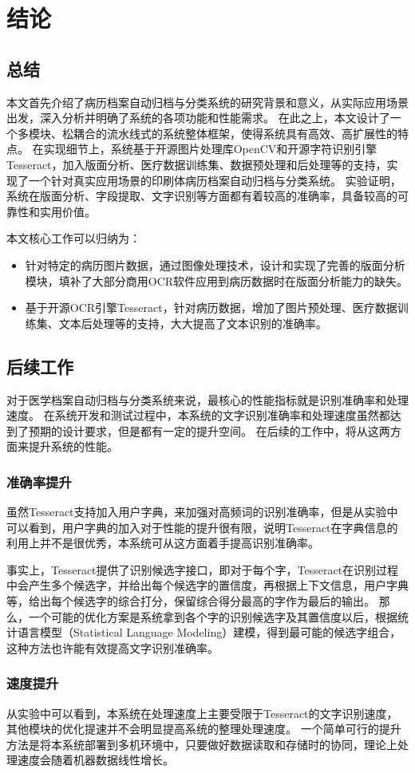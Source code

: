 \chapter{结论}
\label{chap:conclusion}
\section*{总结}
本文首先介绍了病历档案自动归档与分类系统的研究背景和意义，从实际应用场景出发，深入分析并明确了系统的各项功能和性能需求。
在此之上，本文设计了一个多模块、松耦合的流水线式的系统整体框架，使得系统具有高效、高扩展性的特点。
在实现细节上，系统基于开源图片处理库OpenCV和开源字符识别引擎Tesseract，加入版面分析、医疗数据训练集、数据预处理和后处理等的支持，实现了一个针对真实应用场景的印刷体病历档案自动归档与分类系统。
实验证明，系统在版面分析、字段提取、文字识别等方面都有着较高的准确率，具备较高的可靠性和实用价值。

本文核心工作可以归纳为：
\begin{itemize}
  \item 针对特定的病历图片数据，通过图像处理技术，设计和实现了完善的版面分析模块，填补了大部分商用OCR软件应用到病历数据时在版面分析能力的缺失。
  \item 基于开源OCR引擎Tesseract，针对病历数据，增加了图片预处理、医疗数据训练集、文本后处理等的支持，大大提高了文本识别的准确率。
\end{itemize}

\section*{后续工作}
对于医学档案自动归档与分类系统来说，最核心的性能指标就是识别准确率和处理速度。
在系统开发和测试过程中，本系统的文字识别准确率和处理速度虽然都达到了预期的设计要求，但是都有一定的提升空间。
在后续的工作中，将从这两方面来提升系统的性能。
\subsection*{准确率提升}
虽然Tesseract支持加入用户字典，来加强对高频词的识别准确率，但是从实验中可以看到，用户字典的加入对于性能的提升很有限，说明Tesseract在字典信息的利用上并不是很优秀，本系统可从这方面着手提高识别准确率。

事实上，Tesseract提供了识别候选字接口，即对于每个字，Tesseract在识别过程中会产生多个候选字，并给出每个候选字的置信度，再根据上下文信息，用户字典等，给出每个候选字的综合打分，保留综合得分最高的字作为最后的输出。
那么，一个可能的优化方案是系统拿到各个字的识别候选字及其置信度以后，根据统计语言模型（Statistical Language Modeling）\citep{brown1990statistical}建模，得到最可能的候选字组合，这种方法也许能有效提高文字识别准确率。
\subsection*{速度提升}
从实验中可以看到，本系统在处理速度上主要受限于Tesseract的文字识别速度，其他模块的优化提速并不会明显提高系统的整理处理速度。
一个简单可行的提升方法是将本系统部署到多机环境中，只要做好数据读取和存储时的协同，理论上处理速度会随着机器数据线性增长。
